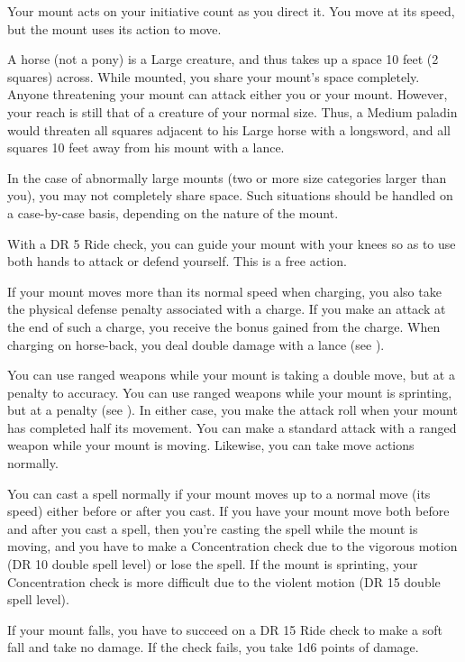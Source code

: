         Your mount acts on your initiative count as you direct it. You move at its speed, but the mount uses its action to move.

         A horse (not a pony) is a Large creature, and thus takes up a space 10 feet (2 squares) across. While mounted, you share your mount's space completely. Anyone threatening your mount can attack either you or your mount. However, your reach is still that of a creature of your normal size. Thus, a Medium paladin would threaten all squares adjacent to his Large horse with a longsword, and all squares 10 feet away from his mount with a lance.

        In the case of abnormally large mounts (two or more size categories larger than you), you may not completely share space. Such situations should be handled on a case-by-case basis, depending on the nature of the mount.

         With a DR 5 Ride check, you can guide your mount with your knees so as to use both hands to attack or defend yourself. This is a free action.

        If your mount moves more than its normal speed when charging, you also take the physical defense penalty associated with a charge. If you make an attack at the end of such a charge, you receive the bonus gained from the charge. When charging on horse-back, you deal double damage with a lance (see ).

        You can use ranged weapons while your mount is taking a double move, but at a  penalty to accuracy. You can use ranged weapons while your mount is sprinting, but at a  penalty (see ). In either case, you make the attack roll when your mount has completed half its movement. You can make a standard attack with a ranged weapon while your mount is moving. Likewise, you can take move actions normally.

         You can cast a spell normally if your mount moves up to a normal move (its speed) either before or after you cast. If you have your mount move both before and after you cast a spell, then you're casting the spell while the mount is moving, and you have to make a Concentration check due to the vigorous motion (DR 10 \add double spell level) or lose the spell. If the mount is sprinting, your Concentration check is more difficult due to the violent motion (DR 15 \add double spell level).

         If your mount falls, you have to succeed on a DR 15 Ride check to make a soft fall and take no damage. If the check fails, you take 1d6 points of damage.


